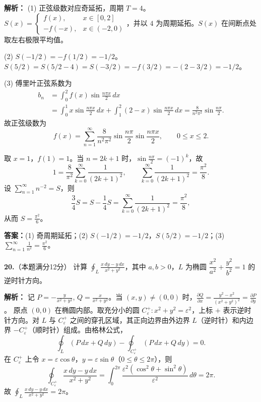 \ifshowsolutions\par\noindent\textbf{解析：} (1) 正弦级数对应奇延拓，周期 $T=4$。
$S(x)=\begin{cases} f(x), & x\in[0,2] \\ -f(-x), & x\in(-2,0) \end{cases}$，并以 $4$ 为周期延拓。$S(x)$ 在间断点处取左右极限平均值。

(2) $S(-1/2) = -f(1/2) = -1/2$。$S(5/2)=S(5/2-4)=S(-3/2) = -f(3/2) = -(2-3/2) = -1/2$。

(3) 傅里叶正弦系数为
\[
\begin{aligned}
b_n
&=\int_0^2 f(x)\sin\frac{n\pi x}{2}\,dx\\
&=\int_0^1 x\sin\frac{n\pi x}{2}\,dx
+\int_1^2(2-x)\sin\frac{n\pi x}{2}\,dx
=\frac{8}{n^2\pi^2}\sin\frac{n\pi}{2}.
\end{aligned}
\]
故正弦级数为
\[
f(x)=\sum_{n=1}^{\infty}\frac{8}{n^2\pi^2}
\sin\frac{n\pi}{2}\sin\frac{n\pi x}{2},\qquad 0\leqslant x\leqslant2.
\]

取 $x=1$，$f(1)=1$。当 $n=2k+1$ 时，$\sin\frac{n\pi}{2}=(-1)^k$，故
\[
1=\frac{8}{\pi^2}\sum_{k=0}^{\infty}\frac{1}{(2k+1)^2},
\qquad
\sum_{k=0}^{\infty}\frac{1}{(2k+1)^2}=\frac{\pi^2}{8}.
\]
设 $\sum_{n=1}^{\infty}n^{-2}=S$，则
\[
\frac{3}{4}S=S-\frac14S=\sum_{k=0}^{\infty}\frac{1}{(2k+1)^2}=\frac{\pi^2}{8},
\]
从而 $S=\frac{\pi^2}{6}$。
\par\noindent\textbf{答案：}(1) 奇周期延拓；(2) $S(-1/2)=-1/2$，$S(5/2)=-1/2$；(3) $\displaystyle\sum_{n=1}^{\infty}\frac{1}{n^2}=\frac{\pi^2}{6}$。\else \answerarea[8] \fi

\vspace{8pt}

\textbf{20.}（本题满分12分）
计算 $\displaystyle\oint_{L} \frac{x\,dy - y\,dx}{x^2+y^2}$，其中 $a,b>0$，$L$ 为椭圆 $\dfrac{x^2}{a^2}+\dfrac{y^2}{b^2}=1$ 的逆时针方向。

\ifshowsolutions\par\noindent\textbf{解析：} 记 $P=-\frac{y}{x^2+y^2}$, $Q=\frac{x}{x^2+y^2}$。当 $(x,y)\neq(0,0)$ 时，$\frac{\partial Q}{\partial x} = \frac{y^2-x^2}{(x^2+y^2)^2} = \frac{\partial P}{\partial y}$。
原点 $(0,0)$ 在椭圆内部。取充分小的圆 $C_{\varepsilon}^+:x^2+y^2=\varepsilon^2$，上标 $+$ 表示逆时针方向。对 $L$ 与 $C_{\varepsilon}^+$ 之间的穿孔区域，其正向边界由外边界 $L$（逆时针）和内边界 $-C_{\varepsilon}^+$（顺时针）组成。由格林公式，
\[
\oint_L(P\,dx+Q\,dy)-\oint_{C_{\varepsilon}^+}(P\,dx+Q\,dy)=0.
\]
在 $C_{\varepsilon}^+$ 上令 $x=\varepsilon\cos\theta$，$y=\varepsilon\sin\theta$（$0\leqslant\theta\leqslant2\pi$），则
\[
\oint_{C_{\varepsilon}^+}\frac{x\,dy-y\,dx}{x^2+y^2}
=\int_0^{2\pi}\frac{\varepsilon^2(\cos^2\theta+\sin^2\theta)}{\varepsilon^2}\,d\theta
=2\pi.
\]
故 $\displaystyle\oint_L\frac{x\,dy-y\,dx}{x^2+y^2}=2\pi$。
\else \answerarea[8] \fi

